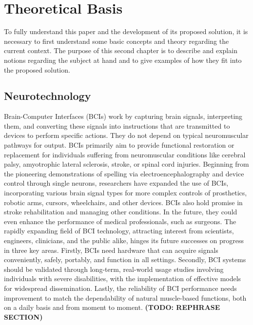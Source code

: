 
\chapter{Theoretical Basis}\label{cap:theory}
To fully understand this paper and the development of its proposed solution, it is necessary to first understand some basic concepts and theory regarding the current context. The purpose of this second chapter is to describe and explain notions regarding the subject at hand and to give examples of how they fit into the proposed solution.


\section{Neurotechnology}
Brain-Computer Interfaces (BCIs) work by capturing brain signals, interpreting them, and converting these signals into instructions that are transmitted to devices to perform specific actions. They do not depend on typical neuromuscular pathways for output. BCIs primarily aim to provide functional restoration or replacement for individuals suffering from neuromuscular conditions like cerebral palsy, amyotrophic lateral sclerosis, stroke, or spinal cord injuries. Beginning from the pioneering demonstrations of spelling via electroencephalography and device control through single neurons, researchers have expanded the use of BCIs, incorporating various brain signal types for more complex controls of prosthetics, robotic arms, cursors, wheelchairs, and other devices. BCIs also hold promise in stroke rehabilitation and managing other conditions. In the future, they could even enhance the performance of medical professionals, such as surgeons. The rapidly expanding field of BCI technology, attracting interest from scientists, engineers, clinicians, and the public alike, hinges its future successes on progress in three key areas. Firstly, BCIs need hardware that can acquire signals conveniently, safely, portably, and function in all settings. Secondly, BCI systems should be validated through long-term, real-world usage studies involving individuals with severe disabilities, with the implementation of effective models for widespread dissemination. Lastly, the reliability of BCI performance needs improvement to match the dependability of natural muscle-based functions, both on a daily basis and from moment to moment. {\bfseries(TODO: REPHRASE SECTION)}


